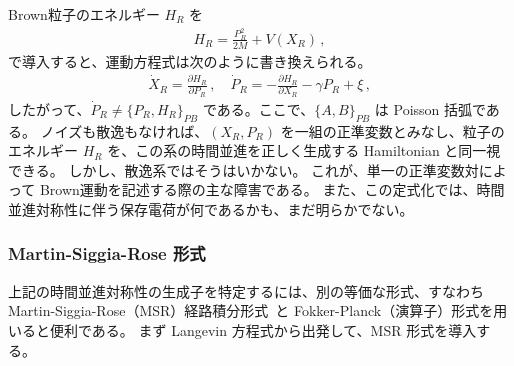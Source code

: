 Brown粒子のエネルギー $H_R$ を
\begin{align}
 H_R = \frac{P^2_R}{2M} + V(X_R) \,,
\end{align}
で導入すると、運動方程式は次のように書き換えられる。
\begin{align}
 \dot{X}_R=\frac{\partial H_R}{\partial P_R} 
 \,,
 \quad
 \dot{P}_R=-\frac{\partial H_R}{\partial X_R}- \gamma P_R + \xi\, ,
 \label{eq:langevin2}
\end{align}
したがって、$\dot{P}_R \neq \{P_R, H_R \}_{PB}$ である。ここで、$\{A,B\}_{PB}$ は Poisson 括弧である。
ノイズも散逸もなければ、$(X_R,P_R)$ を一組の正準変数とみなし、粒子のエネルギー $H_R$ を、この系の時間並進を正しく生成する Hamiltonian と同一視できる。
しかし、散逸系ではそうはいかない。
これが、単一の正準変数対によって Brown運動を記述する際の主な障害である。
また、この定式化では、時間並進対称性に伴う保存電荷が何であるかも、まだ明らかでない。

\subsubsection{Martin-Siggia-Rose 形式}
\label{section:lmsrfp}
上記の時間並進対称性の生成子を特定するには、別の等価な形式、すなわち Martin-Siggia-Rose（MSR）経路積分形式~\cite{PhysRevA.8.423,Janssen1976,PhysRevB.18.4913}と Fokker-Planck（演算子）形式を用いると便利である。
まず Langevin 方程式から出発して、MSR 形式を導入する。


